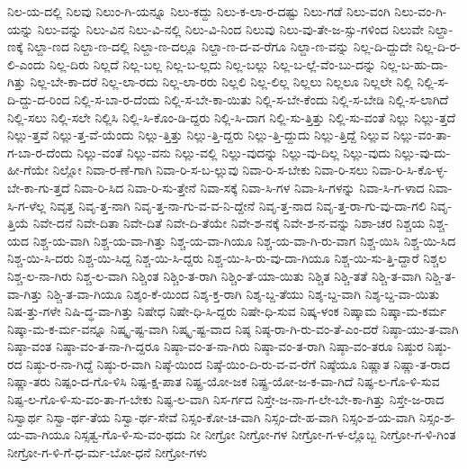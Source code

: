 {ನಿಲ-ಯ-ದಲ್ಲಿ
ನಿಲವು
ನಿಲುಂ-ಗಿ-ಯನ್ನೂ
ನಿಲು-ಕದ್ದು
ನಿಲು-ಕ-ಲಾ-ರ-ದಷ್ಟು
ನಿಲು-ಗಡೆ
ನಿಲು-ವಂಗಿ
ನಿಲು-ವಂ-ಗಿ-ಯನ್ನು
ನಿಲು-ವನ್ನು
ನಿಲು-ವಿನ
ನಿಲು-ವಿ-ನಲ್ಲಿ
ನಿಲು-ವಿ-ನಿಂದ
ನಿಲುವು
ನಿಲು-ವು-ತೇ-ಜ-ಸ್ಸು-ಗಳಿಂದ
ನಿಲುವೇ
ನಿಲ್ದಾ-ಣಕ್ಕೆ
ನಿಲ್ದಾ-ಣದ
ನಿಲ್ದಾ-ಣ-ದಲ್ಲಿ
ನಿಲ್ದಾ-ಣ-ದಲ್ಲೂ
ನಿಲ್ದಾ-ಣ-ದ-ವ-ರೆಗೂ
ನಿಲ್ದಾ-ಣ-ವನ್ನು
ನಿಲ್ಲ-ದಿ-ದ್ದುದೇ
ನಿಲ್ಲ-ದಿ-ರ-ಲಿ-ಎಂದು
ನಿಲ್ಲ-ದಿರು
ನಿಲ್ಲದೆ
ನಿಲ್ಲ-ಬಲ್ಲ
ನಿಲ್ಲ-ಬ-ಲ್ಲದು
ನಿಲ್ಲ-ಬಲ್ಲು
ನಿಲ್ಲ-ಬ-ಲ್ಲೆ-ವೆಂ-ಬು-ದನ್ನು
ನಿಲ್ಲ-ಬ-ಹು-ದಾ-ಗಿತ್ತು
ನಿಲ್ಲ-ಬೇ-ಕಾ-ದರೆ
ನಿಲ್ಲ-ಲಾ-ರದು
ನಿಲ್ಲ-ಲಾ-ರರು
ನಿಲ್ಲಲಿ
ನಿಲ್ಲ-ಲಿಲ್ಲ
ನಿಲ್ಲಲು
ನಿಲ್ಲಲೂ
ನಿಲ್ಲಲೇ
ನಿಲ್ಲಿ
ನಿಲ್ಲಿ-ಸ-ದಿ-ದ್ದು-ದ-ರಿಂದ
ನಿಲ್ಲಿ-ಸ-ಬಾ-ರ-ದೆಂದು
ನಿಲ್ಲಿ-ಸ-ಬೇ-ಕಾ-ಯಿತು
ನಿಲ್ಲಿ-ಸ-ಬೇ-ಕೆಂದು
ನಿಲ್ಲಿ-ಸ-ಬೇಡಿ
ನಿಲ್ಲಿ-ಸ-ಲಾಗಿದೆ
ನಿಲ್ಲಿ-ಸಲು
ನಿಲ್ಲಿ-ಸಲೇ
ನಿಲ್ಲಿಸಿ
ನಿಲ್ಲಿ-ಸಿ-ಕೊಂ-ಡಿ-ದ್ದರು
ನಿಲ್ಲಿ-ಸಿ-ದಾಗ
ನಿಲ್ಲಿ-ಸು-ತ್ತಿತ್ತು
ನಿಲ್ಲಿ-ಸು-ವಂತೆ
ನಿಲ್ಲು
ನಿಲ್ಲು-ತ್ತದೆ
ನಿಲ್ಲು-ತ್ತವೆ
ನಿಲ್ಲು-ತ್ತ-ವೆ-ಯೆಂದು
ನಿಲ್ಲು-ತ್ತಿತ್ತು
ನಿಲ್ಲು-ತ್ತಿ-ದ್ದರು
ನಿಲ್ಲು-ತ್ತಿ-ದ್ದುದು
ನಿಲ್ಲು-ತ್ತಿದ್ದೆ
ನಿಲ್ಲುವ
ನಿಲ್ಲು-ವಂ-ತಾ-ಗ-ಬಾ-ರ-ದೆಂದು
ನಿಲ್ಲು-ವಂತೆ
ನಿಲ್ಲು-ವನು
ನಿಲ್ಲು-ವಲ್ಲಿ
ನಿಲ್ಲು-ವುದನ್ನು
ನಿಲ್ಲು-ವು-ದಿಲ್ಲ
ನಿಲ್ಲು-ವುದು
ನಿಲ್ಲು-ವು-ದು-ಹೀ-ಗೆಯೇ
ನಿಲ್ಲೋ
ನಿವಾ-ರ-ಣೆ-ಗಾಗಿ
ನಿವಾ-ರಿ-ಸ-ಬ-ಲ್ಲುವು
ನಿವಾ-ರಿ-ಸ-ಬೇಕು
ನಿವಾ-ರಿ-ಸಲು
ನಿವಾ-ರಿ-ಸಿ-ಕೊ-ಳ್ಳ-ಬೇ-ಕಾ-ಗು-ತ್ತದೆ
ನಿವಾ-ರಿ-ಸಿದ
ನಿವಾ-ರಿ-ಸು-ತ್ತೇನೆ
ನಿವಾ-ಸಕ್ಕೆ
ನಿವಾ-ಸಿ-ಗಳ
ನಿವಾ-ಸಿ-ಗಳನ್ನು
ನಿವಾ-ಸಿ-ಗ-ಳಾದ
ನಿವಾ-ಸಿ-ಗ-ಳೆಲ್ಲ
ನಿವೃತ್ತ
ನಿವೃ-ತ್ತ-ನಾಗಿ
ನಿವೃ-ತ್ತ-ನಾ-ಗು-ವ-ವ-ನಿ-ದ್ದೇನೆ
ನಿವೃ-ತ್ತ-ನಾದ
ನಿವೃ-ತ್ತ-ರಾ-ಗು-ವು-ದಾ-ಗಲಿ
ನಿವೃ-ತ್ತಿಯೆ
ನಿವೇ-ದನೆ
ನಿವೇ-ದಿತಾ
ನಿವೇ-ದಿತೆ
ನಿವೇ-ದಿ-ತೆಯೇ
ನಿವೇ-ಶ-ನಕ್ಕೆ
ನಿವೇ-ಶ-ನ-ವನ್ನು
ನಿಶಾ-ಚರ
ನಿಶ್ಚಯ
ನಿಶ್ಚ-ಯದ
ನಿಶ್ಚ-ಯ-ವಾಗಿ
ನಿಶ್ಚ-ಯ-ವಾ-ಗಿತ್ತು
ನಿಶ್ಚ-ಯ-ವಾ-ಗಿಯೂ
ನಿಶ್ಚ-ಯ-ವಾ-ಗಿ-ರು-ವಾಗ
ನಿಶ್ಚ-ಯಿಸಿ
ನಿಶ್ಚ-ಯಿ-ಸಿದ
ನಿಶ್ಚ-ಯಿ-ಸಿ-ದರು
ನಿಶ್ಚ-ಯಿ-ಸಿದ್ದ
ನಿಶ್ಚ-ಯಿ-ಸಿ-ದ್ದರು
ನಿಶ್ಚ-ಯಿ-ಸಿ-ರು-ವು-ದಾ-ಗಿಯೂ
ನಿಶ್ಚ-ಯಿ-ಸು-ತ್ತಿ-ದ್ದಾರೆ
ನಿಶ್ಚಲ
ನಿಶ್ಚ-ಲ-ನಾ-ಗಿರು
ನಿಶ್ಚ-ಲ-ವಾಗಿ
ನಿಶ್ಚಿಂತ
ನಿಶ್ಚಿಂ-ತ-ರಾಗಿ
ನಿಶ್ಚಿಂ-ತೆ-ಯಾ-ಯಿತು
ನಿಶ್ಚಿತ
ನಿಶ್ಚಿ-ತತೆ
ನಿಶ್ಚಿ-ತ-ವಾಗಿ
ನಿಶ್ಚಿ-ತ-ವಾ-ಗಿತ್ತು
ನಿಶ್ಚಿ-ತ-ವಾ-ಗಿಯೂ
ನಿಶ್ಶಂ-ಕೆ-ಯಿಂದ
ನಿಶ್ಶ-ಕ್ತ-ರಾಗಿ
ನಿಶ್ಶ-ಬ್ದ-ತೆಯು
ನಿಶ್ಶ-ಬ್ದ-ವಾಗಿ
ನಿಶ್ಶ-ಬ್ದ-ವಾ-ಯಿತು
ನಿಷ-ತ್ತು-ಗಳೇ
ನಿಷಿ-ದ್ಧ-ವಾ-ಗಿತ್ತು
ನಿಷೇಧ
ನಿಷೇ-ಧಿ-ಸಿ-ದ್ದರು
ನಿಷೇ-ಧಿ-ಸುವ
ನಿಷ್ಕ-ಳಂಕ
ನಿಷ್ಕಾಮ
ನಿಷ್ಕಾ-ಮ-ಕರ್ಮ
ನಿಷ್ಕಾ-ಮ-ಕ-ರ್ಮ-ವನ್ನೂ
ನಿಷ್ಕೃ-ಷ್ಟ-ವಾಗಿ
ನಿಷ್ಕೃ-ಷ್ಟ-ವಾದ
ನಿಷ್ಠ
ನಿಷ್ಠ-ರಾ-ಗಿ-ರು-ವಂ-ತೆ-ಎಂ-ದರೆ
ನಿಷ್ಠಾ-ಯು-ತ-ವಾಗಿ
ನಿಷ್ಠಾ-ವಂತ
ನಿಷ್ಠಾ-ವಂ-ತ-ನಾ-ಗಿ-ದ್ದರೂ
ನಿಷ್ಠಾ-ವಂ-ತ-ನಾ-ಗಿರು
ನಿಷ್ಠಾ-ವಂ-ತ-ರಾಗಿ
ನಿಷ್ಠಾ-ವಂ-ತರೂ
ನಿಷ್ಠುರ
ನಿಷ್ಠು-ರದ
ನಿಷ್ಠು-ರ-ನಾ-ಗಿದ್ದೆ
ನಿಷ್ಠು-ರ-ವಾಗಿ
ನಿಷ್ಠೆ-ಯಿಂದ
ನಿಷ್ಠೆ-ಯಿಂ-ದಿ-ರು-ವ-ವ-ರೆಗೆ
ನಿಷ್ಠೆಯೂ
ನಿಷ್ಣಾತ
ನಿಷ್ಣಾ-ತ-ರಾದ
ನಿಷ್ಣಾ-ತರು
ನಿಷ್ಪಂ-ದ-ಗೊ-ಳಿಸಿ
ನಿಷ್ಪ-ಕ್ಷ-ಪಾತ
ನಿಷ್ಪ್ರ-ಯೋ-ಜಕ
ನಿಷ್ಪ್ರ-ಯೋ-ಜ-ಕ-ವಾ-ಗಿದೆ
ನಿಷ್ಫ-ಲ-ಗೊ-ಳಿ-ಸುವ
ನಿಷ್ಫ-ಲ-ಗೊ-ಳಿ-ಸು-ವಂ-ತಾ-ಗ-ಬೇಕು
ನಿಷ್ಫ-ಲ-ವಾಗಿ
ನಿಸ-ರ್ಗದ
ನಿಸ್ತೇ-ಜ-ನಾ-ಗ-ಲೇ-ಬೇ-ಕಾ-ಗಿತ್ತು
ನಿಸ್ತೇ-ಜ-ರಾದ
ನಿಸ್ವಾರ್ಥ
ನಿಸ್ವಾ-ರ್ಥ-ತೆಯ
ನಿಸ್ವಾ-ರ್ಥ-ಸೇವೆ
ನಿಸ್ಸಂ-ಕೋ-ಚ-ವಾಗಿ
ನಿಸ್ಸಂ-ದೇ-ಹ-ವಾಗಿ
ನಿಸ್ಸಂ-ಶ-ಯ-ವಾಗಿ
ನಿಸ್ಸಂ-ಶ-ಯ-ವಾ-ಗಿಯೂ
ನಿಸ್ಸತ್ವ-ಗೊ-ಳಿ-ಸು-ವಂ-ಥದು
ನೀ
ನೀಗ್ರೋ
ನೀಗ್ರೋ-ಗಳ
ನೀಗ್ರೋ-ಗ-ಳ-ಲ್ಲೊಬ್ಬ
ನೀಗ್ರೋ-ಗ-ಳಿ-ಗಿಂತ
ನೀಗ್ರೋ-ಗ-ಳಿ-ಗೆ-ಧ-ರ್ಮ-ಬೋ-ಧನೆ
ನೀಗ್ರೋ-ಗಳು
}
